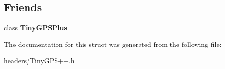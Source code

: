 \subsection*{Friends}
\begin{DoxyCompactItemize}
\item 
class {\bfseries Tiny\+G\+P\+S\+Plus}\hypertarget{struct_tiny_g_p_s_location_a6501fd5ef19ae166d43e0e5781609ee2}{}\label{struct_tiny_g_p_s_location_a6501fd5ef19ae166d43e0e5781609ee2}

\end{DoxyCompactItemize}


The documentation for this struct was generated from the following file\+:\begin{DoxyCompactItemize}
\item 
headers/Tiny\+G\+P\+S++.\+h\end{DoxyCompactItemize}
